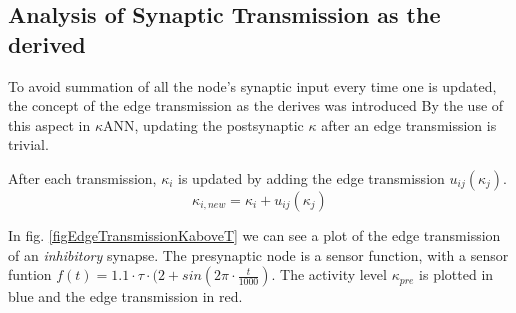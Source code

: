 	\subsection{Analysis of Synaptic Transmission as the derived}
			\label{ssecAnalysisOfSynTransAsTheDerived}
			To avoid summation of all the node's synaptic input every time one is updated, the concept of the edge transmission as the derives was introduced
			By the use of this aspect in $\kappa$ANN, updating the postsynaptic $\kappa$ after an edge transmission is trivial.
	
			After each transmission, $\kappa_i$ is updated by adding the edge transmission $u_{ij}(\kappa_j)$. 	 	 %
			\begin{equation}
				\kappa_{i, new} = \kappa_{i} + u_{ij}(\kappa_j)
			\end{equation}
			
			
			
			In fig. \ref{figEdgeTransmissionKaboveT} we can see a plot of the edge transmission of an \emph{inhibitory} synapse.
			The presynaptic node is a sensor function, with a sensor funtion \mbox{$f(t) = 1.1 \cdot \tau \cdot (2 + sin( 2\pi \cdot \frac{t}{1000})$}.
			The activity level $\kappa_{pre}$ is plotted in blue and the edge transmission in red.
	

